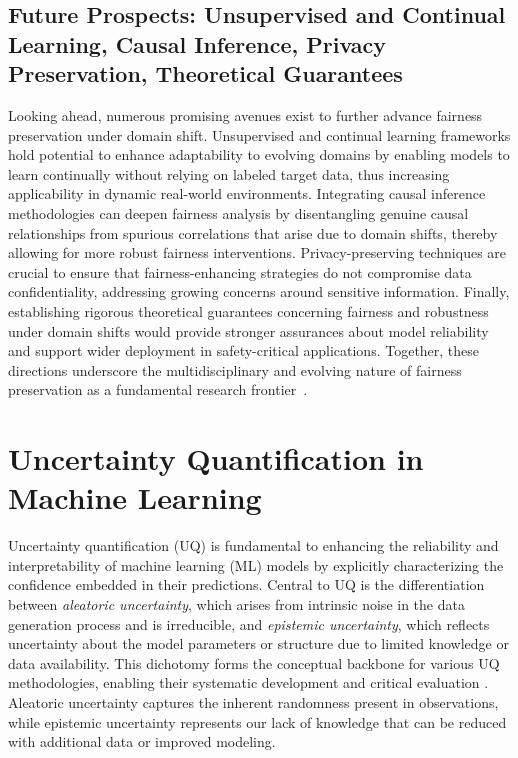 \documentclass[sigconf]{acmart}
\begin{document}
\subsection{Future Prospects: Unsupervised and Continual Learning, Causal Inference, Privacy Preservation, Theoretical Guarantees}

Looking ahead, numerous promising avenues exist to further advance fairness preservation under domain shift. Unsupervised and continual learning frameworks hold potential to enhance adaptability to evolving domains by enabling models to learn continually without relying on labeled target data, thus increasing applicability in dynamic real-world environments. Integrating causal inference methodologies can deepen fairness analysis by disentangling genuine causal relationships from spurious correlations that arise due to domain shifts, thereby allowing for more robust fairness interventions. Privacy-preserving techniques are crucial to ensure that fairness-enhancing strategies do not compromise data confidentiality, addressing growing concerns around sensitive information. Finally, establishing rigorous theoretical guarantees concerning fairness and robustness under domain shifts would provide stronger assurances about model reliability and support wider deployment in safety-critical applications. Together, these directions underscore the multidisciplinary and evolving nature of fairness preservation as a fundamental research frontier~\cite{ref26}.

\section{Uncertainty Quantification in Machine Learning}

Uncertainty quantification (UQ) is fundamental to enhancing the reliability and interpretability of machine learning (ML) models by explicitly characterizing the confidence embedded in their predictions. Central to UQ is the differentiation between \emph{aleatoric uncertainty}, which arises from intrinsic noise in the data generation process and is irreducible, and \emph{epistemic uncertainty}, which reflects uncertainty about the model parameters or structure due to limited knowledge or data availability. This dichotomy forms the conceptual backbone for various UQ methodologies, enabling their systematic development and critical evaluation \cite{ref28}. Aleatoric uncertainty captures the inherent randomness present in observations, while epistemic uncertainty represents our lack of knowledge that can be reduced with additional data or improved modeling.
\end{document}
